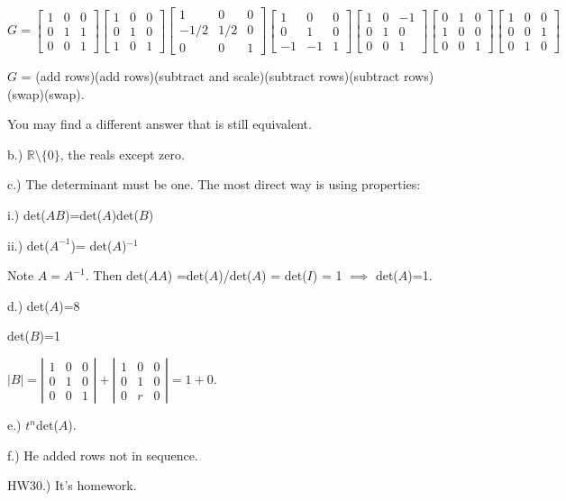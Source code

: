\documentclass{article}
\begin{document}
$G=\left[\begin{array}{ccc}
1 & 0 & 0 \\
0 & 1 & 1\\
0& 0 & 1
\end{array}\right] 
\left[\begin{array}{ccc}
1 & 0 & 0 \\
0 & 1 & 0\\
1& 0 & 1
\end{array}\right] \left[\begin{array}{ccc}
1 & 0 & 0 \\
-1/2 & 1/2 & 0\\
0& 0 & 1
\end{array}\right] \left[\begin{array}{ccc}
1 & 0 & 0 \\
0 & 1 & 0\\
-1& -1 & 1
\end{array}\right] \left[\begin{array}{ccc}
1 & 0 & -1 \\
0 & 1 & 0\\
0& 0 & 1
\end{array}\right] \left[\begin{array}{ccc}
0 & 1 & 0 \\
1 & 0 & 0\\
0& 0 & 1
\end{array}\right] \left[\begin{array}{ccc}
1 & 0 & 0 \\
0 & 0 & 1\\
0& 1 & 0
\end{array}\right]$

$G$ = (add rows)(add rows)(subtract and scale)(subtract rows)(subtract rows)(swap)(swap).

You may find a different answer that is still equivalent. 

b.) $\mathbb{R}\setminus \{0\}$, the reals except zero.

c.) The determinant must be one. The most direct way is using properties:

i.) det($AB$)=det($A$)det($B$)

ii.) det($A^{-1}$)= det($A$)$^{-1}$

Note $A=A^{-1}$. Then det($AA$) =det($A$)/det($A$) = det($I$) = 1 $\implies$ det($A$)=1.

d.) det($A$)=8

det($B$)=1

$\vert B\vert =\left\vert \begin{array}{ccc}
1 & 0 & 0 \\
0 & 1 & 0\\
0& 0 & 1
\end{array}\right\vert  + \left\vert \begin{array}{ccc}
1 & 0 & 0 \\
0 & 1 & 0\\
0& r & 0
\end{array}\right\vert = 1 + 0.$

e.) $t^n$det($A$).

f.) He added rows not in sequence. 

HW30.) It's homework.
\end{document}

